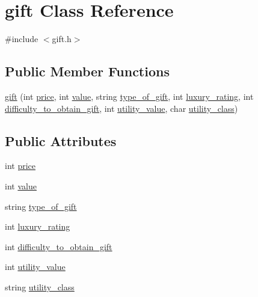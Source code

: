 \hypertarget{classgift}{}\section{gift Class Reference}
\label{classgift}


{\ttfamily \#include $<$gift.\+h$>$}

\subsection*{Public Member Functions}
\begin{DoxyCompactItemize}
\item 
\hyperlink{classgift_a63b728ae46adca610d41cad4f66b8b24}{gift} (int \hyperlink{classgift_a0b47f2fdc5eb88daa269cc827324c931}{price}, int \hyperlink{classgift_aa9e6fcf5bc68d7f151e7a853a25dcbeb}{value}, string \hyperlink{classgift_a3feab4934d66fb383fe269fef66112ec}{type\+\_\+of\+\_\+gift}, int \hyperlink{classgift_aa0bfbb583b69e093e31558a1565cad9a}{luxury\+\_\+rating}, int \hyperlink{classgift_af1320e49b31139686edbcd0b7c262c00}{difficulty\+\_\+to\+\_\+obtain\+\_\+gift}, int \hyperlink{classgift_a4b2ef48d28d424249c482ed19832b92c}{utility\+\_\+value}, char \hyperlink{classgift_a768493e393b6e4f89e3653b4229d8b6a}{utility\+\_\+class})
\end{DoxyCompactItemize}
\subsection*{Public Attributes}
\begin{DoxyCompactItemize}
\item 
int \hyperlink{classgift_a0b47f2fdc5eb88daa269cc827324c931}{price}
\item 
int \hyperlink{classgift_aa9e6fcf5bc68d7f151e7a853a25dcbeb}{value}
\item 
string \hyperlink{classgift_a3feab4934d66fb383fe269fef66112ec}{type\+\_\+of\+\_\+gift}
\item 
int \hyperlink{classgift_aa0bfbb583b69e093e31558a1565cad9a}{luxury\+\_\+rating}
\item 
int \hyperlink{classgift_af1320e49b31139686edbcd0b7c262c00}{difficulty\+\_\+to\+\_\+obtain\+\_\+gift}
\item 
int \hyperlink{classgift_a4b2ef48d28d424249c482ed19832b92c}{utility\+\_\+value}
\item 
string \hyperlink{classgift_a768493e393b6e4f89e3653b4229d8b6a}{utility\+\_\+class}
\end{DoxyCompactItemize}


